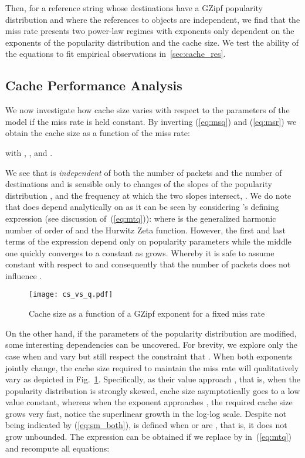 \documentclass[twocolumn, 10pt]{article}
\theoremstyle{plain}
\begin{document}
Then, for a reference string whose destinations have a GZipf popularity distribution
and where the references to objects are independent, we find that the miss
rate presents two power-law regimes with exponents only dependent on the
exponents of the popularity distribution and the cache size. We test the ability of the
equations to fit empirical observations in~\ref{sec:cache_res}.


\subsection{Cache Performance Analysis}\label{sec:cache_bounds}
We now investigate how cache size varies with respect to the parameters of the
model if the miss rate is held constant. By inverting (\ref{eq:msq}) and (\ref{eq:msr}) we obtain the cache size
as a function of the miss rate:


\noindent with ,  ,
 and . 

We see that  is \emph{independent} of both the number of packets 
and the number of destinations  and is sensible
only to changes of the slopes of the popularity distribution ,  and the
frequency at which the two slopes intersect, . We do note that  does depend
analytically on  as it can be seen by considering 's defining expression
(see discussion of~(\ref{eq:mtq})):
 where
 is the generalized harmonic number of order
 of  and  the Hurwitz
Zeta function.  However, the first and last terms of the expression depend
only on popularity parameters while the middle one quickly converges to a
constant as  grows. Whereby it is safe to assume  constant with
respect to  and consequently that the number of packets does not influence
.


\begin{figure}[h]
    \centering
    \texttt{[image: cs\_vs\_q.pdf]}
    \caption{Cache size as a function of a GZipf exponent for a fixed miss rate}
    \label{fig:cs_vs_q}
\end{figure}

On the other hand, if the parameters of the popularity distribution are
modified, some interesting dependencies can be uncovered. For brevity, we explore only the
case when  and  vary but still respect the constraint that . 
When both exponents jointly change, the cache size required to
maintain the miss rate will qualitatively vary as depicted in
Fig.~\ref{fig:cs_vs_q}. Specifically, as their value approach , that is,
when the popularity distribution is strongly skewed, cache size asymptotically
goes to a low value constant, whereas when the exponent approaches , the
required cache size grows very fast, notice the superlinear growth in the
log-log scale. Despite not being indicated by (\ref{eq:sm_both}),  is
defined when  or  are , that is, it does not grow unbounded. The
expression can be obtained if we replace  by  in~(\ref{eq:mtq}) and
recompute all equations:
\end{document}
